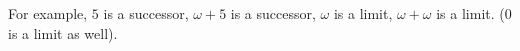 \documentclass[a4paper]{article}
\begin{document}
For example, $5$ is a successor, $\omega+5$ is a successor, $\omega$ is a limit, $\omega+\omega$ is a limit. ($0$ is a limit as well).

\iffalse
\begin{equation*}
\begin{aligned}

\end{aligned}
\end{equation*}
\fi
\end{document}
